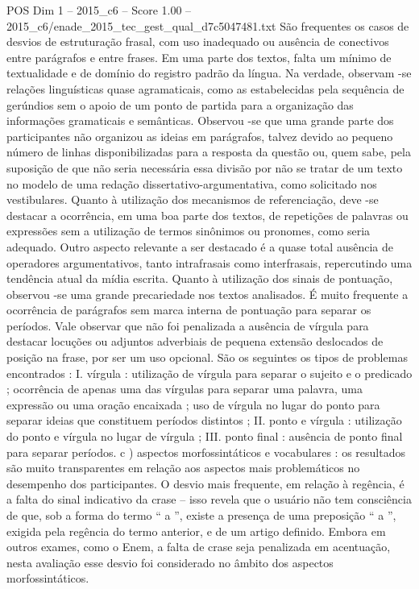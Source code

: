 \begin{textsample}{POS Dim 1 – 2015\_c6 – Score 1.00 – 2015\_c6/enade\_2015\_tec\_gest\_qual\_d7c5047481.txt}
São frequentes os casos de desvios de estruturação frasal, com uso inadequado ou ausência de conectivos entre parágrafos e entre frases.
Em uma parte dos textos, falta um mínimo de textualidade e de domínio do registro padrão da língua.
Na verdade, observam -se relações linguísticas quase agramaticais, como as estabelecidas pela sequência de gerúndios sem o apoio de um ponto de partida para a organização das informações gramaticais e semânticas.
Observou -se que uma grande parte dos participantes não organizou as ideias em parágrafos, talvez devido ao pequeno número de linhas disponibilizadas para a resposta da questão ou, quem sabe, pela suposição de que não seria necessária essa divisão por não se tratar de um texto no modelo de uma redação dissertativo-argumentativa, como solicitado nos vestibulares.
Quanto à utilização dos mecanismos de referenciação, deve -se destacar a ocorrência, em uma boa parte dos textos, de repetições de palavras ou expressões sem a utilização de termos sinônimos ou pronomes, como seria adequado.
Outro aspecto relevante a ser destacado é a quase total ausência de operadores argumentativos, tanto intrafrasais como interfrasais, repercutindo uma tendência atual da mídia escrita.
Quanto à utilização dos sinais de pontuação, observou -se uma grande precariedade nos textos analisados.
É muito frequente a ocorrência de parágrafos sem marca interna de pontuação para separar os períodos.
Vale observar que não foi penalizada a ausência de vírgula para destacar locuções ou adjuntos adverbiais de pequena extensão deslocados de posição na frase, por ser um uso opcional.
São os seguintes os tipos de problemas encontrados : I. vírgula : utilização de vírgula para separar o sujeito e o predicado ; ocorrência de apenas uma das vírgulas para separar uma palavra, uma expressão ou uma oração encaixada ; uso de vírgula no lugar do ponto para separar ideias que constituem períodos distintos ; II. ponto e vírgula : utilização do ponto e vírgula no lugar de vírgula ; III. ponto final : ausência de ponto final para separar períodos. c ) aspectos morfossintáticos e vocabulares : os resultados são muito transparentes em relação aos aspectos mais problemáticos no desempenho dos participantes.
O desvio mais frequente, em relação à regência, é a falta do sinal indicativo da crase – isso revela que o usuário não tem consciência de que, sob a forma do termo “ a ”, existe a presença de uma preposição “ a ”, exigida pela regência do termo anterior, e de um artigo definido.
Embora em outros exames, como o Enem, a falta de crase seja penalizada em acentuação, nesta avaliação esse desvio foi considerado no âmbito dos aspectos morfossintáticos.

\end{textsample}
